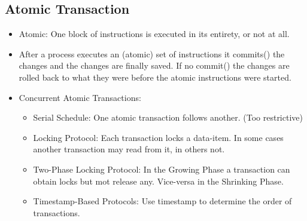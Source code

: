 \documentclass[a4wide,10pt]{article}
\begin{document}
\subsection{Atomic Transaction} %
\label{sub:atomic_transaction}
\begin{itemize}
	\item Atomic: One block of instructions is executed in its entirety, or not at all.
	\item After a process executes an (atomic) set of instructions it commits() the changes and the changes are finally saved. If no commit() the changes are rolled back to what they were before the atomic instructions were started.
	\item Concurrent Atomic Transactions:
	\begin{itemize}
		\item Serial Schedule: One atomic transaction follows another. (Too restrictive)
		\item Locking Protocol: Each transaction locks a data-item. In some cases another transaction may read from it, in others not.
		\item Two-Phase Locking Protocol: In the Growing Phase a transaction can obtain locks but mot release any. Vice-versa in the Shrinking Phase.
		\item Timestamp-Based Protocols: Use timestamp to determine the order of transactions.
	\end{itemize}
\end{itemize}
\end{document}

